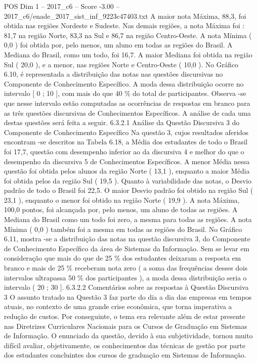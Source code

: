 \begin{textsample}{POS Dim 1 – 2017\_c6 – Score -3.00 – 2017\_c6/enade\_2017\_sist\_inf\_9223c47403.txt}
A maior nota Máxima, 88,3, foi obtida nas regiões Nordeste e Sudeste.
Nas demais regiões, a nota Máxima foi : 81,7 na região Norte, 83,3 na Sul e 86,7 na região Centro-Oeste.
A nota Mínima ( 0,0 ) foi obtida por, pelo menos, um aluno em todas as regiões do Brasil.
A Mediana do Brasil, como um todo, foi 16,7.
A maior Mediana foi obtida na região Sul ( 20,0 ), e a menor, nas regiões Norte e Centro-Oeste ( 10,0 ).
No Gráfico 6.10, é representada a distribuição das notas nas questões discursivas no Componente de Conhecimento Específico.
A moda dessa distribuição ocorre no intervalo [ 0 ; 10 ], com mais do que 40 \% do total de participantes.
Observa -se que nesse intervalo estão computadas as ocorrências de respostas em branco para as três questões discursivas de Conhecimentos Específicos.
A análise de cada uma destas questões será feita a seguir. 6.3.2.1 Análise da Questão Discursiva 3 do Componente de Conhecimento Específico Na questão 3, cujos resultados aferidos encontram -se descritos na Tabela 6.18, a Média dos estudantes de todo o Brasil foi 17,7, questão com desempenho inferior ao da discursiva 4 e melhor do que o desempenho da discursiva 5 de Conhecimentos Específicos.
A menor Média nessa questão foi obtida pelos alunos da região Norte ( 13,1 ), enquanto a maior Média foi obtida pelos da região Sul ( 19,5 ).
Quanto à variabilidade das notas, o Desvio padrão de todo o Brasil foi 22,5.
O maior Desvio padrão foi obtido na região Sul ( 23,1 ), enquanto o menor foi obtido na região Norte ( 19,9 ).
A nota Máxima, 100,0 pontos, foi alcançada por, pelo menos, um aluno de todas as regiões.
A Mediana do Brasil como um todo foi zero, a mesma para todas as regiões.
A nota Mínima ( 0,0 ) também foi a mesma em todas as regiões do Brasil.
No Gráfico 6.11, mostra -se a distribuição das notas na questão discursiva 3, do Componente de Conhecimento Específico da área de Sistemas da Informação.
Sem se levar em consideração que mais do que de 25 \% dos estudantes deixaram a resposta em branco e mais de 25 \% receberam nota zero ( a soma das frequências desses dois intervalos ultrapassa 50 \% dos participantes ), a moda dessa distribuição seria o intervalo ( 20 ; 30 ]. 6.3.2.2 Comentários sobre as respostas à Questão Discursiva 3 O assunto tratado na Questão 3 faz parte do dia a dia das empresas em tempos atuais, no contexto de uma grande crise econômica, que torna imperativa a redução de custos.
Por conseguinte, o tema era relevante além de estar presente nas Diretrizes Curriculares Nacionais para os Cursos de Graduação em Sistemas de Informação.
O enunciado da questão, devido à sua subjetividade, tornou muito difícil avaliar, objetivamente, os conhecimentos das técnicas de gestão por parte dos estudantes concluintes dos cursos de graduação em Sistemas de Informação.

\end{textsample}
